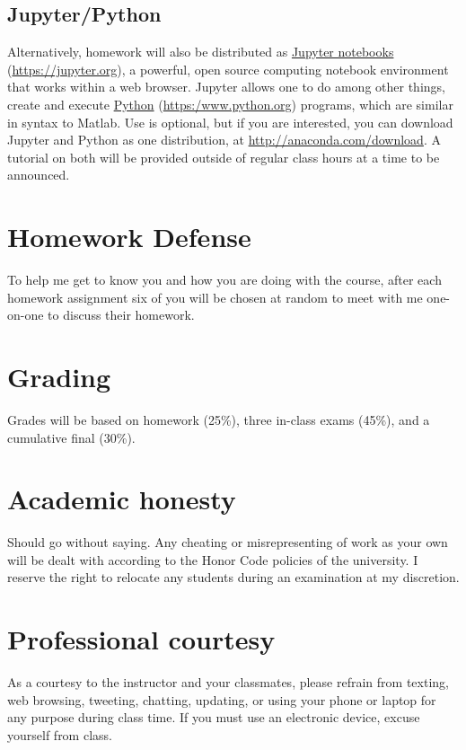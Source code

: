 \documentclass[11pt]{article}
\begin{document}
\subsection{Jupyter/Python}
\label{sec:org3087477}
Alternatively, homework will also be distributed as \href{https://jupyter.org/}{Jupyter notebooks} (\url{https://jupyter.org}), a powerful, open source computing notebook environment that works within a web browser. Jupyter allows one to do among other things, create and execute \href{https://www.python.org/}{Python} (\url{https:/www.python.org}) programs, which are similar in syntax to Matlab. Use is optional, but if you are interested, you can download Jupyter and Python as one distribution, at \url{http://anaconda.com/download}. A tutorial on both will be provided outside of regular class hours at a time to be announced.
\section{Homework Defense}
\label{sec:orgb92e40e}
To help me get to know you and how you are doing with the course, after each homework assignment six of you will be chosen at random to meet with me one-on-one to discuss their homework.

\section{Grading}
\label{sec:org3369af6}
Grades will be based on homework (25\%), three in-class exams (45\%), and a cumulative final (30\%).

\section{Academic honesty}
\label{sec:org05a4e9d}
Should go without saying. Any cheating or misrepresenting of work as your own will be dealt with according to the Honor Code policies of the university. I reserve the right to relocate any students during an examination at my discretion.

\section{Professional courtesy}
\label{sec:org832a4a4}
As a courtesy to the instructor and your classmates, please refrain from
texting, web browsing, tweeting, chatting, updating, or using your phone or laptop for any
purpose during class time.  If you must use an electronic device, excuse
yourself from class.
\end{document}
